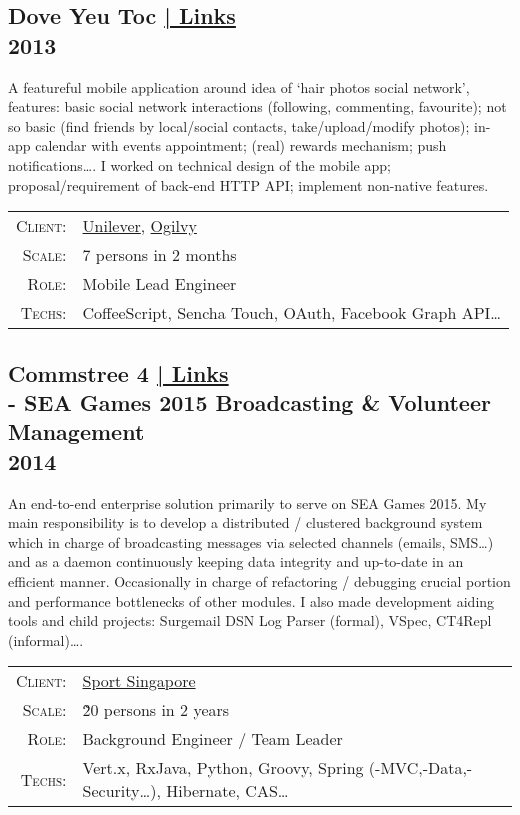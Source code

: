 \documentclass[a4paper,10pt]{article}
\begin{document}
\subsection*{Dove Yeu Toc \hfill \footnotesize {\hyperlink{dove-links}{| Links}}\\\small 2013}
A featureful mobile application around idea of `hair photos social network', features: basic social network interactions (following, commenting, favourite); not so basic (find friends by local/social contacts, take/upload/modify photos); in-app calendar with events appointment; (real) rewards mechanism; push notifications\ldots. I worked on technical design of the mobile app; proposal/requirement of back-end HTTP API; implement non-native features.

\begin{tabular}{rl}
    \textsc{Client:} & \href{http://www.unilever.com/}{Unilever}, \href{http://www.ogilvy.com/}{Ogilvy}\\
    \textsc{Scale:} & 7 persons in 2 months\\
    \textsc{Role}: & Mobile Lead Engineer\\
    \textsc{Techs:} & CoffeeScript, Sencha Touch, OAuth, Facebook Graph API\ldots\\
\end{tabular}

\subsection*{Commstree 4 \hfill \footnotesize {\hyperlink{ct-links}{| Links}}\\\large - SEA Games 2015 Broadcasting \& Volunteer Management\\\small 2014}
An end-to-end enterprise solution primarily to serve on SEA Games 2015. My main responsibility is to develop a distributed / clustered background system which in charge of broadcasting messages via selected channels (emails, SMS\ldots) and as a daemon continuously keeping data integrity and up-to-date in an efficient manner. Occasionally in charge of refactoring / debugging crucial portion and performance bottlenecks of other modules. I also made development aiding tools and child projects: Surgemail DSN Log Parser (formal), VSpec, CT4Repl (informal)\ldots.


\begin{tabular}{rl}
    \textsc{Client:} & \href{http://www.sportsingapore.gov.sg/}{Sport Singapore}\\
    \textsc{Scale:} & \~20 persons in 2 years\\
    \textsc{Role:} & Background Engineer / Team Leader\\
    \textsc{Techs:} & Vert.x, RxJava, Python, Groovy, Spring (-MVC,-Data,-Security\ldots), Hibernate, CAS\ldots\\
\end{tabular}
\end{document}
